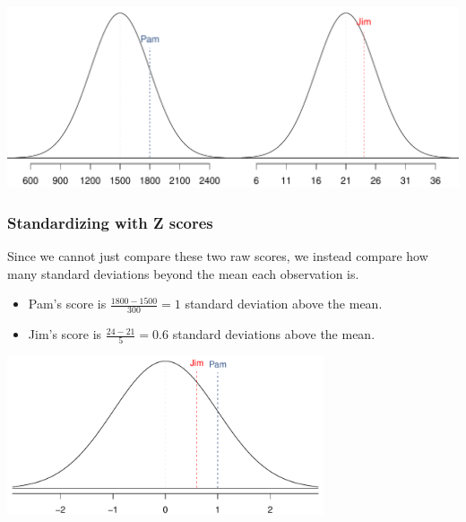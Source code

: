 \begin{frame}
\frametitle{}


\begin{center}
\includegraphics[width=\textwidth]{3-1_normal_distribution/figures/satActNormals/satActNormals}
\end{center}

\end{frame}


\begin{frame}
\frametitle{Standardizing with Z scores}

Since we cannot just compare these two raw scores, we instead compare how many standard deviations beyond the mean each observation is.

\begin{itemize}

\item Pam's score is $\frac{1800 - 1500}{300} = 1$ standard deviation above the mean.

\item Jim's score is $\frac{24 - 21}{5} = 0.6$ standard deviations above the mean.

\end{itemize}

\begin{center}
\includegraphics[width=0.7\textwidth]{3-1_normal_distribution/figures/satActNormals/satActNormalsStandardized}
\end{center}

\end{frame}

